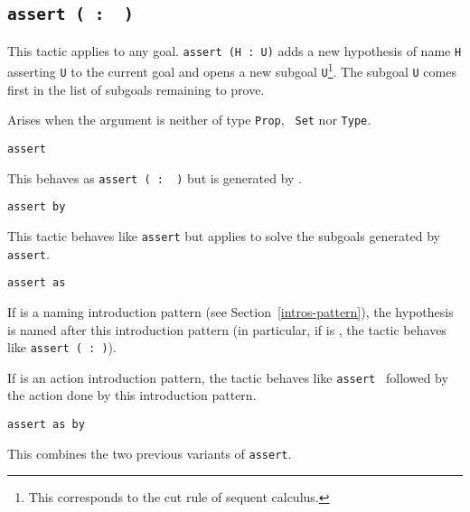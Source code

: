 \begin{coq_example*}
\subsection{\tt assert ( {\ident} :\ {\form} )}

This tactic applies to any goal. {\tt assert (H : U)} adds a new
hypothesis of name \texttt{H} asserting \texttt{U} to the current goal
and opens a new subgoal \texttt{U}\footnote{This corresponds to the
  cut rule of sequent calculus.}. The subgoal {\texttt U} comes first
in the list of subgoals remaining to prove.

\begin{ErrMsgs}
\item {}

  Arises when the argument {\form} is neither of type {\tt Prop}, {\tt
    Set} nor {\tt Type}.

\end{ErrMsgs}

\begin{Variants}

\item{\tt assert {\form}}

  This behaves as {\tt assert ( {\ident} :\ {\form} )} but
  {\ident} is generated by {\Coq}.

\item \texttt{assert {\form} by {\tac}}

  This tactic behaves like \texttt{assert} but applies {\tac}
  to solve the subgoals generated by \texttt{assert}.

  \ErrMsg {}

\item \texttt{assert {\form} as {\intropattern}}

  If {\intropattern} is a naming introduction pattern (see
  Section~\ref{intros-pattern}), the hypothesis is named after this
  introduction pattern (in particular, if {\intropattern} is {\ident},
  the tactic behaves like \texttt{assert ({\ident} :\ {\form})}).

  If {\intropattern} is an action introduction pattern, the tactic
  behaves like \texttt{assert {\form}} followed by the action done by
  this introduction pattern.

\item \texttt{assert {\form} as {\intropattern} by {\tac}}

  This combines the two previous variants of {\tt assert}.


\end{Variants}
\end{coq_example*}
